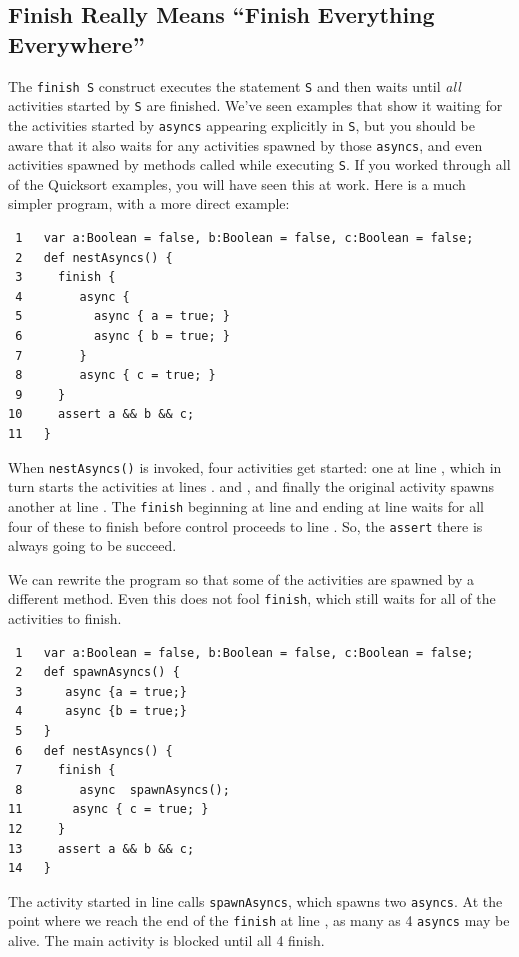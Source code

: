 \subsection{Finish Really Means ``Finish Everything Everywhere''}\label{ssec:finishmeans}

The {\tt finish S} construct executes the statement {\tt S} and then
waits until {\em all} activities started by {\tt S}
are finished.  We've seen examples that show it waiting for the activities started
by {\tt asyncs}
appearing explicitly in {\tt S},  but you should be aware that it also waits
for any activities spawned by those {\tt asyncs}, and even activities
spawned by methods called while executing {\tt S}.  If you worked through all of
the Quicksort examples, you will have seen this at work.  Here is a much simpler program,
with a more direct example:
\begin{verbatim}
 1   var a:Boolean = false, b:Boolean = false, c:Boolean = false;
 2   def nestAsyncs() {
 3     finish { 
 4        async {
 5          async { a = true; }
 6          async { b = true; }
 7        }
 8        async { c = true; }
 9     }
10     assert a && b && c;
11   }
\end{verbatim}

When {\tt nestAsyncs()} is invoked, four activities get started: one at 
line ,
which in turn starts the activities at lines .
and ,
and finally the original activity spawns another at line .
The {\tt finish} beginning at line
 and ending at line 
waits for all four of these to finish before control
proceeds to line .  
So, the {\tt assert} there is always going to be succeed.

We can rewrite the program so that some of the activities are spawned by
a different method.  Even this does not fool {\tt finish}, which still waits
for all of the activities to finish.
\begin{verbatim}
 1   var a:Boolean = false, b:Boolean = false, c:Boolean = false;
 2   def spawnAsyncs() { 
 3      async {a = true;}
 4      async {b = true;} 
 5   }
 6   def nestAsyncs() {
 7     finish { 
 8        async  spawnAsyncs();
11       async { c = true; }
12     }
13     assert a && b && c;
14   }
\end{verbatim}
The activity started in line  calls {\tt spawnAsyncs},
which spawns two {\tt asyncs}.  At the point where we reach the end of the
{\tt finish} at line , as many as 4 {\tt asyncs} may be
alive.  The main activity is blocked until all 4 finish.


